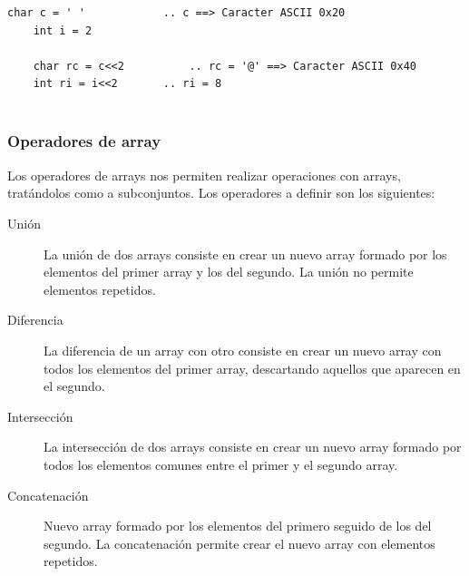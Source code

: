 \documentclass[11pt, english]{article}
\begin{document}
	\begin{lstlisting}[caption=Ejemplo de uso los operadores bit a bit]
	char c = ' '			.. c ==> Caracter ASCII 0x20
	int i = 2
	
	char rc = c<<2			.. rc = '@' ==> Caracter ASCII 0x40
	int ri = i<<2  		.. ri = 8
	
	\end{lstlisting}
	
	\subsubsection{Operadores de array}
	Los operadores de arrays nos permiten realizar operaciones con arrays, tratándolos como a subconjuntos. Los operadores a definir son los siguientes:
	\begin{description}
		\item [Unión] La unión de dos arrays consiste en crear un nuevo array formado por los elementos del primer array y los del segundo. La unión no permite elementos repetidos.
		\item [Diferencia] La  diferencia de un array con otro consiste en crear un nuevo array con todos los elementos del primer array, descartando aquellos que aparecen en el segundo.
		\item [Intersección] La intersección de dos arrays consiste en crear un nuevo array formado por todos los elementos comunes entre el primer y el segundo array.
		\item [Concatenación] Nuevo array formado por los elementos del primero seguido de los del segundo. La concatenación permite crear el nuevo array con elementos repetidos.
	\end{description}
	
\end{document}
